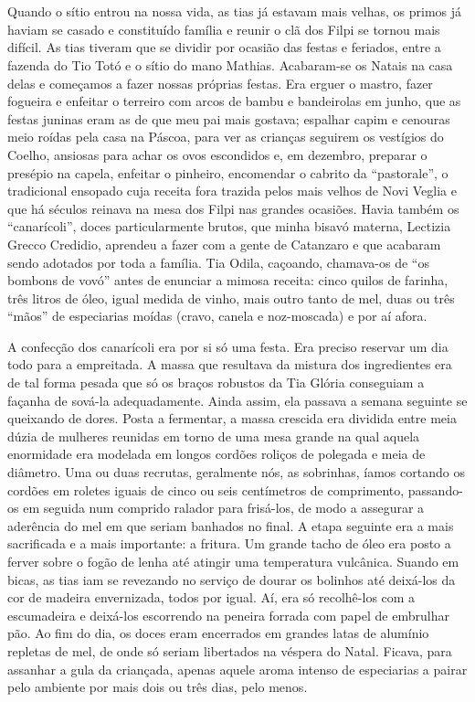 \chapter{}
Quando o sítio entrou na nossa vida, as tias já estavam mais velhas, os primos já haviam se casado e constituído família e reunir o clã dos Filpi se tornou mais difícil.
As tias tiveram que se dividir por ocasião das festas e feriados, entre a fazenda do Tio Totó e o sítio do mano Mathias.
Acabaram-se os Natais na casa delas e começamos a fazer nossas próprias festas.
Era erguer o mastro, fazer fogueira e enfeitar o terreiro com arcos de bambu e bandeirolas em junho, que as festas juninas eram as de que meu pai mais gostava; espalhar capim e cenouras meio roídas pela casa na Páscoa, para ver as crianças seguirem os vestígios do Coelho, ansiosas para achar os ovos escondidos e, em dezembro, preparar o presépio na capela, enfeitar o pinheiro, encomendar o cabrito da ``pastorale'', o tradicional ensopado cuja receita fora trazida pelos mais velhos de Novi Veglia e que há séculos reinava na mesa dos Filpi nas grandes ocasiões.
Havia também os ``canarícoli'', doces particularmente brutos, que minha bisavó materna, Lectizia Grecco Credidio, aprendeu a fazer com a gente de Catanzaro e que acabaram sendo adotados por toda a família.
Tia Odila, caçoando, chamava-os de ``os bombons de vovó'' antes de enunciar a mimosa receita: cinco quilos de farinha, três litros de óleo, igual medida de vinho, mais outro tanto de mel, duas ou três ``mãos'' de especiarias moídas (cravo, canela e noz-moscada) e por aí afora.


A confecção dos canarícoli era por si só uma festa.
Era preciso reservar um dia todo para a empreitada.
A massa que resultava da mistura dos ingredientes era de tal forma pesada que só os braços robustos da Tia Glória conseguiam a façanha de sová-la adequadamente.
Ainda assim, ela passava a semana seguinte se queixando de dores.
Posta a fermentar, a massa crescida era dividida entre meia dúzia de mulheres reunidas em torno de uma mesa grande na qual aquela enormidade era modelada em longos cordões roliços de polegada e meia de diâmetro.
Uma ou duas recrutas, geralmente nós, as sobrinhas, íamos cortando os cordões em roletes iguais de cinco ou seis centímetros de comprimento, passando-os em seguida num comprido ralador para frisá-los, de modo a assegurar a aderência do mel em que seriam banhados no final.
A etapa seguinte era a mais sacrificada e a mais importante: a fritura.
Um grande tacho de óleo era posto a ferver sobre o fogão de lenha até atingir uma temperatura vulcânica.
Suando em bicas, as tias iam se revezando no serviço de dourar os bolinhos até deixá-los da cor de madeira envernizada, todos por igual.
Aí, era só recolhê-los com a escumadeira e deixá-los escorrendo na peneira forrada com papel de embrulhar pão.
Ao fim do dia, os doces eram encerrados em grandes latas de alumínio repletas de mel, de onde só seriam libertados na véspera do Natal.
Ficava, para assanhar a gula da criançada, apenas aquele aroma intenso de especiarias a pairar pelo ambiente por mais dois ou três dias, pelo menos.

